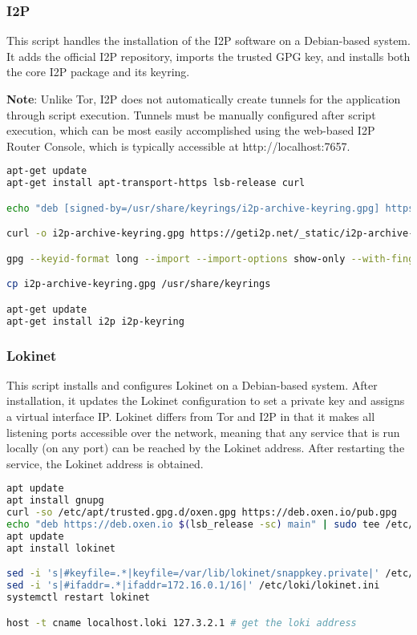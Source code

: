 \subsubsection{I2P}
This script handles the installation of the I2P software on a Debian-based system. It adds the official I2P repository, imports the trusted GPG key, and installs both the core I2P package and its keyring.

\textbf{Note}: Unlike Tor, I2P does not automatically create tunnels for the application through script execution. Tunnels must be manually configured after script execution, which can be most easily accomplished using the web-based I2P Router Console, which is typically accessible at http://localhost:7657.

\footnotesize
\begin{lstlisting}[language=bash, breaklines=true, breakatwhitespace=true, showstringspaces=false]
apt-get update
apt-get install apt-transport-https lsb-release curl

echo "deb [signed-by=/usr/share/keyrings/i2p-archive-keyring.gpg] https://deb.i2p.net/ $(lsb_release -sc) main" > /etc/apt/sources.list.d/i2p.list

curl -o i2p-archive-keyring.gpg https://geti2p.net/_static/i2p-archive-keyring.gpg

gpg --keyid-format long --import --import-options show-only --with-fingerprint i2p-archive-keyring.gpg

cp i2p-archive-keyring.gpg /usr/share/keyrings

apt-get update
apt-get install i2p i2p-keyring
\end{lstlisting}
\normalsize

\subsubsection{Lokinet}
This script installs and configures Lokinet on a Debian-based system. After installation, it updates the Lokinet configuration to set a private key and assigns a virtual interface IP. Lokinet differs from Tor and I2P in that it makes all listening ports accessible over the network, meaning that any service that is run locally (on any port) can be reached by the Lokinet address. After restarting the service, the Lokinet address is obtained.

\footnotesize
\begin{lstlisting}[language=bash, breaklines=true, breakatwhitespace=true, showstringspaces=false]
apt update
apt install gnupg
curl -so /etc/apt/trusted.gpg.d/oxen.gpg https://deb.oxen.io/pub.gpg
echo "deb https://deb.oxen.io $(lsb_release -sc) main" | sudo tee /etc/apt/sources.list.d/oxen.list
apt update
apt install lokinet

sed -i 's|#keyfile=.*|keyfile=/var/lib/lokinet/snappkey.private|' /etc/loki/lokinet.ini
sed -i 's|#ifaddr=.*|ifaddr=172.16.0.1/16|' /etc/loki/lokinet.ini
systemctl restart lokinet

host -t cname localhost.loki 127.3.2.1 # get the loki address
\end{lstlisting}


